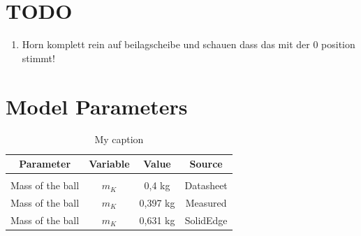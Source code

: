\documentclass[twoside,colorback,accentcolor=tud4c,11pt]{tudreport}
\begin{document}
			
			\section{TODO}
			
			\begin{enumerate}
				\item Horn komplett rein auf beilagscheibe und schauen dass das mit der 0 position stimmt!
			\end{enumerate}
	\section{Model Parameters}

	
\begin{table}[]
\centering
\caption{My caption}
\label{my-label}
\begin{tabular}{cccc}
\hline
\multicolumn{1}{|c|}{{ \textbf{Parameter}}}                                                                          & \multicolumn{1}{c|}{{\textbf{Variable}}} & \multicolumn{1}{c|}{{ \textbf{Value}}}                  & \multicolumn{1}{c|}{{ \textbf{Source}}} \\ \hline
                                                                                                                        &                                              &                                                            &                                            \\ \hline
\multicolumn{1}{|c|}{Mass of the ball}                                                                                  & \multicolumn{1}{c|}{$m_{K}$}                & \multicolumn{1}{c|}{0,4 kg}                                & \multicolumn{1}{c|}{Datasheet}             \\ \hline
\multicolumn{1}{|c|}{Mass of the ball}                                                                                  & \multicolumn{1}{c|}{$m_{K}$}                & \multicolumn{1}{c|}{0,397 kg}                              & \multicolumn{1}{c|}{Measured}              \\ \hline
\multicolumn{1}{|c|}{Mass of the ball}                                                                                  & \multicolumn{1}{c|}{$m_{K}$}                & \multicolumn{1}{c|}{0,631 kg}                              & \multicolumn{1}{c|}{SolidEdge}             \\ \hline

\end{tabular}
\end{table}
\end{document}
